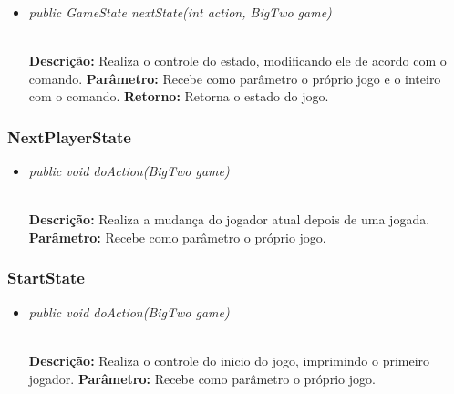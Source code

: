 \documentclass[12pt]{article}
\begin{document}
\vspace{0.2 true cm}

\begin{itemize}
\item \begin{large}\textit{public GameState nextState(int action, BigTwo game)}\end{large}\\
\subitem \textbf{Descrição:} Realiza o controle do estado, modificando ele de acordo com o comando.
\subitem \textbf{Parâmetro:} Recebe como parâmetro o próprio jogo e o inteiro com o comando.
\subitem \textbf{Retorno:} Retorna o estado do jogo.
\end{itemize}

\vspace{0.2 true cm}

\subsubsection{NextPlayerState}

\begin{itemize}
\item \begin{large}\textit{public void doAction(BigTwo game)}\end{large}\\
\subitem \textbf{Descrição:} Realiza a mudança do jogador atual depois de uma jogada.
\subitem \textbf{Parâmetro:} Recebe como parâmetro o próprio jogo.
\end{itemize}

\vspace{0.2 true cm}

\subsubsection{StartState}

\begin{itemize}
\item \begin{large}\textit{public void doAction(BigTwo game)}\end{large}\\
\subitem \textbf{Descrição:} Realiza o controle do inicio do jogo, imprimindo o primeiro jogador.
\subitem \textbf{Parâmetro:} Recebe como parâmetro o próprio jogo.
\end{itemize}

\vspace{0.2 true cm}
\end{document}
